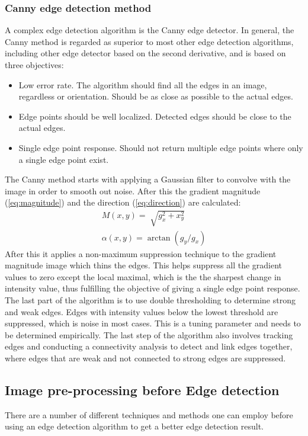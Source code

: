 \subsubsection{Canny edge detection method}
A complex edge detection algorithm is the Canny edge detector\cite{canny}. In general, the Canny method is regarded as superior to most other edge detection algorithms, including other edge detector based on the second derivative, and is based on three objectives:
\begin{itemize}
\item Low error rate. The algorithm should find all the edges in an image, regardless or orientation. Should be as close as possible to the actual edges.
\item Edge points should be well localized. Detected edges should be close to the actual edges.
\item Single edge point response. Should not return multiple edge points where only a single edge point exist.
\end{itemize}
The Canny method starts with applying a Gaussian filter to convolve with the image in order to smooth out noise. After this the gradient magnitude (\ref{eq:magnitude}) and the direction (\ref{eq:direction}) are calculated:
\begin{align*}
M(x,y) = \sqrt[]{g_x^2 +x_y^2}\\
\alpha(x,y) = \arctan(g_y/g_x)
\end{align*}
After this it applies a non-maximum suppression technique to the gradient magnitude image which thins the edges. This helps suppress all the gradient values to zero except the local maximal, which is the the sharpest change in intensity value, thus fulfilling the objective of giving a single edge point response.\\

The last part of the algorithm is to use double thresholding to determine strong and weak edges. Edges with intensity values below the lowest threshold are suppressed, which is noise in most cases. This is a tuning parameter and needs to be determined empirically. The last step of the algorithm also involves tracking edges and conducting a connectivity analysis to detect and link edges together, where edges that are weak and not connected to strong edges are suppressed.\\

\newpage
\subsection{Image pre-processing before Edge detection}
There are a number of different techniques and methods one can employ before using an edge detection algorithm to get a better edge detection result.
